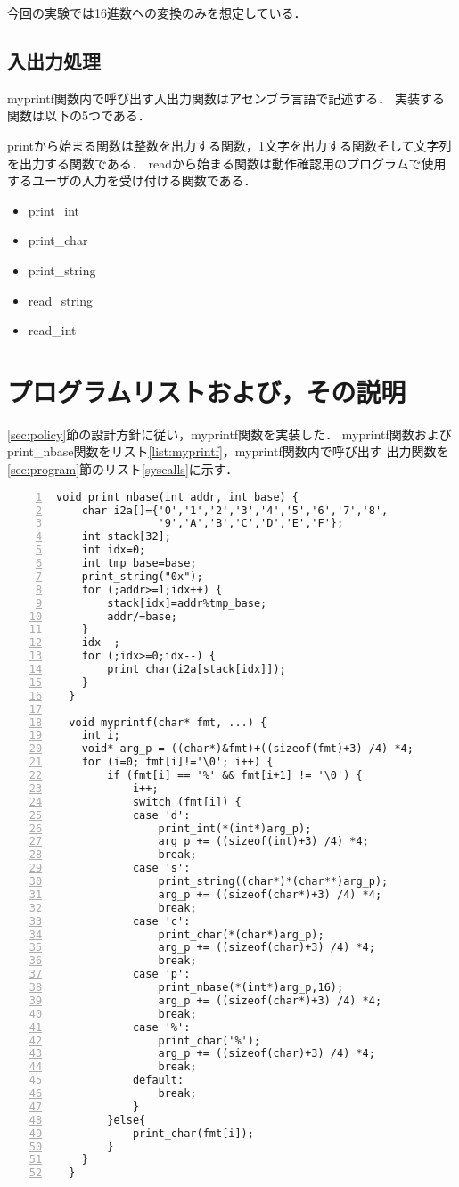 \documentclass[11pt]{jarticle}
\begin{document}
今回の実験では16進数への変換のみを想定している．

\subsection{入出力処理} \label{sec:io}

myprintf関数内で呼び出す入出力関数はアセンブラ言語で記述する．
実装する関数は以下の5つである．

printから始まる関数は整数を出力する関数，1文字を出力する関数そして文字列を出力する関数である．
readから始まる関数は動作確認用のプログラムで使用するユーザの入力を受け付ける関数である．

\begin{itemize}
  \item print\_int
  \item print\_char
  \item print\_string
  \item read\_string
  \item read\_int
\end{itemize}

\section{プログラムリストおよび，その説明} \label{sec:program_exp}

\ref{sec:policy}節の設計方針に従い，myprintf関数を実装した．
myprintf関数およびprint\_nbase関数をリスト\ref{list:myprintf}，myprintf関数内で呼び出す
出力関数を\ref{sec:program}節のリスト\ref{syscalls}に示す．

\begin{lstlisting}[label=list:myprintf,caption=myprintf関数,numbers=left]
  void print_nbase(int addr, int base) {
    char i2a[]={'0','1','2','3','4','5','6','7','8',
                '9','A','B','C','D','E','F'};
    int stack[32];
    int idx=0;
    int tmp_base=base;
    print_string("0x");
    for (;addr>=1;idx++) {
        stack[idx]=addr%tmp_base;
        addr/=base;
    }
    idx--;
    for (;idx>=0;idx--) {
        print_char(i2a[stack[idx]]);
    }
  }

  void myprintf(char* fmt, ...) {
    int i;
    void* arg_p = ((char*)&fmt)+((sizeof(fmt)+3) /4) *4;
    for (i=0; fmt[i]!='\0'; i++) {
        if (fmt[i] == '%' && fmt[i+1] != '\0') {
            i++;
            switch (fmt[i]) {
            case 'd':
                print_int(*(int*)arg_p);
                arg_p += ((sizeof(int)+3) /4) *4;
                break;
            case 's':
                print_string((char*)*(char**)arg_p);
                arg_p += ((sizeof(char*)+3) /4) *4;
                break;
            case 'c':
                print_char(*(char*)arg_p);
                arg_p += ((sizeof(char)+3) /4) *4;
                break;
            case 'p':
                print_nbase(*(int*)arg_p,16);
                arg_p += ((sizeof(char*)+3) /4) *4;
                break;
            case '%':
                print_char('%');
                arg_p += ((sizeof(char)+3) /4) *4;
                break;
            default:
                break;
            }
        }else{
            print_char(fmt[i]);
        }
    }
  }
\end{lstlisting}
\end{document}
